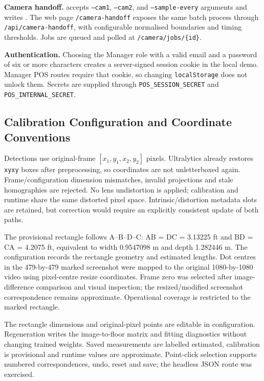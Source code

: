 \textbf{Camera handoff.}  accepts \texttt{--cam1}, \texttt{--cam2}, and \texttt{--sample-every} arguments and writes . The web page \texttt{/camera-handoff} exposes the same batch process through \texttt{/api/camera-handoff}, with configurable normalised boundaries and timing thresholds. Jobs are queued and polled at \texttt{/camera/jobs/\{id\}}.

\textbf{Authentication.} Choosing the Manager role with a valid email and a password of six or more characters creates a server-signed session cookie in the local demo. Manager POS routes require that cookie, so changing \texttt{localStorage} does not unlock them. Secrets are supplied through \texttt{POS\_SESSION\_SECRET} and \texttt{POS\_INTERNAL\_SECRET}.

\subsection{Calibration Configuration and Coordinate Conventions}
Detections use original-frame $[x_1,y_1,x_2,y_2]$ pixels. Ultralytics already restores \texttt{xyxy} boxes after preprocessing, so coordinates are not unletterboxed again. Frame/configuration dimension mismatches, invalid projections and stale homographies are rejected. No lens undistortion is applied; calibration and runtime share the same distorted pixel space. Intrinsic/distortion metadata slots are retained, but correction would require an explicitly consistent update of both paths.

The provisional rectangle follows A--B--D--C: AB = DC = 3.13225 ft and BD = CA = 4.2075 ft, equivalent to width 0.9547098 m and depth 1.282446 m. The configuration records the rectangle geometry and estimated lengths. Dot centres in the 479-by-479 marked screenshot were mapped to the original 1080-by-1080 video using pixel-centre resize coordinates. Frame zero was selected after image-difference comparison and visual inspection; the resized/modified screenshot correspondence remains approximate. Operational coverage is restricted to the marked rectangle.

The rectangle dimensions and original-pixel points are editable in configuration. Regeneration writes the image-to-floor matrix and fitting diagnostics without changing trained weights. Saved measurements are labelled estimated, calibration is provisional and runtime values are approximate. Point-click selection supports numbered correspondences, undo, reset and save; the headless JSON route was exercised.

